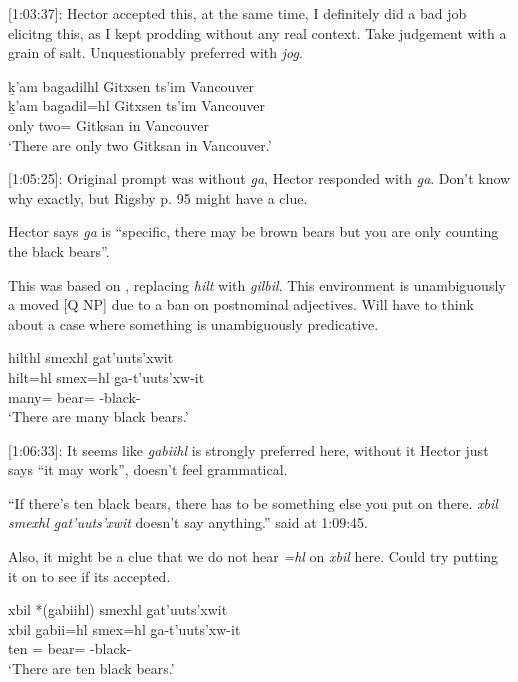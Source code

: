 [1:03:37]: Hector accepted this, at the same time, I definitely did a bad job elicitng this, as I kept prodding without any real context. Take judgement with a grain of salt. Unquestionably preferred with \textit{jog̱}.

\begin{exe}
    \ex \glll ḵ'am bagadilhl Gitxsen ts'im Vancouver \\
    ḵ'am bagadil=hl Gitxsen ts'im Vancouver \\
    only two=\Cn{} Gitksan  in Vancouver  \\
    `There are only two Gitksan in Vancouver.'
\end{exe}

[1:05:25]: Original prompt was without \textit{g̱a}, Hector responded with \textit{g̱a}. Don't know why exactly, but Rigsby p. 95 might have a clue.

Hector says \textit{g̱a} is ``specific, there may be brown bears but you are only counting the black bears''.

This was based on \textcite[314]{bicevskisQuantificationGitksan2017}, replacing \textit{hilt} with \textit{gilbil}. This environment is unambiguously a moved [Q NP] due to a ban on postnominal adjectives. Will have to think about a case where something is unambiguously predicative.

\begin{exe}
    \ex \glll hilthl smexhl g̱at'uuts'xwit \\
    hilt=hl smex=hl g̱a-t'uuts'xw-it \\
    many=\Cn{} bear=\Cn{} \Distr{}-black-\Sx{}   \\
    `There are many black bears.'
\end{exe}

[1:06:33]: It seems like \textit{g̱abiihl} is strongly preferred here, without it Hector just says ``it may work'', doesn't feel grammatical.

``If there's ten black bears, there has to be something else you put on there.\textit{ xbil smexhl g̱at'uuts'xwit} doesn't say anything.'' said at 1:09:45.

Also, it might be a clue that we do not hear \textit{=hl} on \textit{xbil} here. Could try putting it on to see if its accepted.

\begin{exe}
    \ex \glll xbil *(g̱abiihl) smexhl g̱at'uuts'xwit \\
    xbil g̱abii=hl smex=hl g̱a-t'uuts'xw-it \\
    ten  \Cnt{}=\Cn{} bear=\Cn{} \Distr{}-black-\Sx{}   \\
    `There are ten black bears.'
\end{exe}

